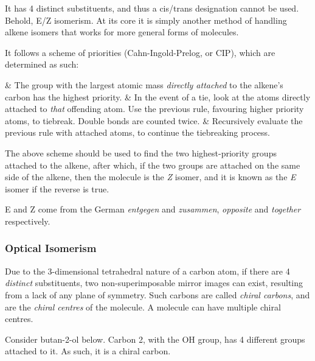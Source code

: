 
		It has 4 distinct substituents, and thus a cis/trans designation cannot be used. Behold, E/Z isomerism. At its core it
		is simply another method of handling alkene isomers that works for more general forms of molecules.

		It follows a scheme of priorities (Cahn-Ingold-Prelog, or CIP), which are determined as such:
		\begin{romanlist}
			& The group with the largest atomic mass \textit{directly attached} to the alkene's carbon has the highest priority.
			& In the event of a tie, look at the atoms directly attached to \textit{that} offending atom. Use the previous
			  rule, favouring higher priority atoms, to tiebreak. Double bonds are counted twice.
			& Recursively evaluate the previous rule with attached atoms, to continue the tiebreaking process.
		\end{romanlist}

		The above scheme should be used to find the two highest-priority groups attached to the alkene, after which, if the two
		groups are attached on the same side of the alkene, then the molecule is the \textit{Z} isomer, and it is known as the
		\textit{E} isomer if the reverse is true.

		E and Z come from the German \textit{entgegen} and \textit{zusammen}, \textit{opposite} and \textit{together}
		respectively.



	\pagebreak
	\subsubsection{Optical Isomerism}

		Due to the 3-dimensional tetrahedral nature of a carbon atom, if there are 4 \textit{distinct} substituents, two
		non-superimposable mirror images can exist, resulting from a lack of any plane of symmetry. Such carbons are called
		\textit{chiral carbons}, and are the \textit{chiral centres} of the molecule. A molecule can have multiple chiral
		centres.

		Consider butan-2-ol below. Carbon 2, with the OH group, has 4 different groups attached to it. As such, it is a chiral carbon.


